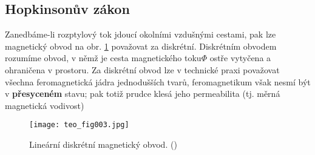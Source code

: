     \subsection{Hopkinsonův zákon}
      Zanedbáme-li rozptylový tok jdoucí okolními vzdušnými ces\-tami, pak lze magnetický obvod na 
      obr. \ref{teo:fig003} považovat za diskrétní. Diskrétním obvodem rozumíme obvod, v němž je 
      cesta magnetického toku\(\Phi\) ostře vytyčena a ohraničena v prostoru. Za diskrétní obvod 
      lze v technické praxi považovat všechna feromagnetická jádra jednodušších tvarů, 
      feromagnetikum však nesmí být v \textbf{přesyceném} stavu; pak totiž prudce klesá jeho 
      permeabilita (tj. měrná magnetická vodivost)
      
      \begin{figure}[ht!]  %
        \centering
        \texttt{[image: teo\_fig003.jpg]}
        \caption{Lineární diskrétní magnetický obvod.
                (\cite[s.~151]{Patocka4})}
        \label{teo:fig003}
      \end{figure}
      
